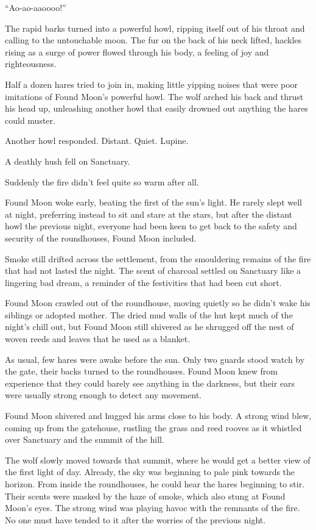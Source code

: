 ``Ao-ao-aaoooo!''

The rapid barks turned into a powerful howl, ripping itself out of his throat and calling to the untouchable moon. The fur on the back of his neck lifted, hackles rising as a surge of power flowed through his body, a feeling of joy and righteousness.

Half a dozen hares tried to join in, making little yipping noises that were poor imitations of Found Moon's powerful howl. The wolf arched his back and thrust his head up, unleashing another howl that easily drowned out anything the hares could muster.

Another howl responded. Distant. Quiet. Lupine.

A deathly hush fell on Sanctuary.

Suddenly the fire didn't feel quite so warm after all.

\secdiv

\noindent Found Moon woke early, beating the first of the sun's light. He rarely slept well at night, preferring instead to sit and stare at the stars, but after the distant howl the previous night, everyone had been keen to get back to the safety and security of the roundhouses, Found Moon included.

Smoke still drifted across the settlement, from the smouldering remains of the fire that had not lasted the night. The scent of charcoal settled on Sanctuary like a lingering bad dream, a reminder of the festivities that had been cut short.

Found Moon crawled out of the roundhouse, moving quietly so he didn't wake his siblings or adopted mother. The dried mud walls of the hut kept much of the night's chill out, but Found Moon still shivered as he shrugged off the nest of woven reeds and leaves that he used as a blanket.

As usual, few hares were awake before the sun. Only two guards stood watch by the gate, their backs turned to the roundhouses. Found Moon knew from experience that they could barely see anything in the darkness, but their ears were usually strong enough to detect any movement.

Found Moon shivered and hugged his arms close to his body. A strong wind blew, coming up from the gatehouse, rustling the grass and reed rooves as it whistled over Sanctuary and the summit of the hill.

The wolf slowly moved towards that summit, where he would get a better view of the first light of day. Already, the sky was beginning to pale pink towards the horizon. From inside the roundhouses, he could hear the hares beginning to stir. Their scents were masked by the haze of smoke, which also stung at Found Moon's eyes. The strong wind was playing havoc with the remnants of the fire. No one must have tended to it after the worries of the previous night.

